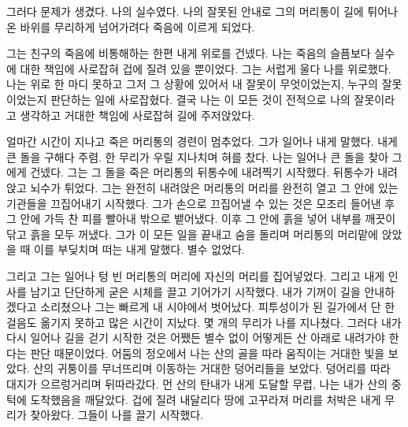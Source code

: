 \documentclass[12pt, b6paper, openany]{memoir}
\newenvironment{article}{}{}
\begin{document}
\begin{article}
그러다 문제가 생겼다. 나의 실수였다. 나의 잘못된 안내로 그의 머리통이 길에 튀어나온 바위를 무리하게 넘어가려다 죽음에 이르게 되었다.

그는 친구의 죽음에 비통해하는 한편 내게 위로를 건넸다. 나는 죽음의 슬픔보다 실수에 대한 책임에 사로잡혀 겁에 질려 있을 뿐이었다. 그는 서럽게 울다 나를 위로했다. 나는 위로 한 마디 못하고 그저 그 상황에 있어서 내 잘못이 무엇이었는지, 누구의 잘못이었는지 판단하는 일에 사로잡혔다. 결국 나는 이 모든 것이 전적으로 나의 잘못이라고 생각하고 거대한 책임에 사로잡혀 길에 주저앉았다.

얼마간 시간이 지나고 죽은 머리통의 경련이 멈추었다. 그가 일어나 내게 말했다. 내게 큰 돌을 구해다 주렴. 한 무리가 우릴 지나치며 혀를 찼다. 나는 일어나 큰 돌을 찾아 그에게 건넸다. 그는 그 돌을 죽은 머리통의 뒤통수에 내려찍기 시작했다. 뒤통수가 내려앉고 뇌수가 튀었다. 그는 완전히 내려앉은 머리통의 머리를 완전히 열고 그 안에 있는 기관들을 끄집어내기 시작했다. 그가 손으로 끄집어낼 수 있는 것은 모조리 들어낸 후 그 안에 가득 찬 피를 빨아내 밖으로 뱉어냈다. 이후 그 안에 흙을 넣어 내부를 깨끗이 닦고 흙을 모두 꺼냈다. 그가 이 모든 일을 끝내고 숨을 돌리며 머리통의 머리맡에 앉았을 때 이를 부딪치며 떠는 내게 말했다. 별수 없었다.

그리고 그는 일어나 텅 빈 머리통의 머리에 자신의 머리를 집어넣었다. 그리고 내게 인사를 남기고 단단하게 굳은 시체를 끌고 기어가기 시작했다. 내가 기꺼이 길을 안내하겠다고 소리쳤으나 그는 빠르게 내 시야에서 벗어났다. 피투성이가 된 길가에서 단 한 걸음도 옮기지 못하고 많은 시간이 지났다. 몇 개의 무리가 나를 지나쳤다. 그러다 내가 다시 일어나 길을 걷기 시작한 것은 어쨌든 별수 없이 어떻게든 산 아래로 내려가야 한다는 판단 때문이었다. 어둠의 정오에서 나는 산의 골을 따라 움직이는 거대한 빛을 보았다. 산의 귀퉁이를 무너뜨리며 이동하는 거대한 덩어리들을 보았다. 덩어리를 따라 대지가 으르렁거리며 뒤따라갔다. 먼 산의 탄내가 내게 도달할 무렵, 나는 내가 산의 중턱에 도착했음을 깨달았다. 겁에 질려 내달리다 땅에 고꾸라져 머리를 처박은 내게 무리가 찾아왔다. 그들이 나를 끌기 시작했다.
\end{article}
\end{document}
